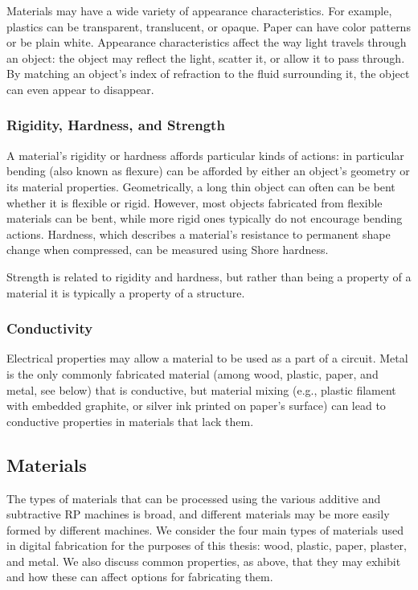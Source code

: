 Materials may have a wide variety of appearance characteristics. For example, plastics can be transparent, translucent, or opaque. Paper can have color patterns or be plain white. Appearance characteristics affect the way light travels through an object: the object may reflect the light, scatter it, or allow it to pass through. By matching an object's index of refraction to the fluid surrounding it, the object can even appear to disappear.

\subsubsection{Rigidity, Hardness, and Strength}

A material's rigidity or hardness affords particular kinds of actions: in particular bending (also known as flexure) can be afforded by either an object's geometry or its material properties. Geometrically, a long thin object can often can be bent whether it is flexible or rigid. However, most objects fabricated from flexible materials can be bent, while more rigid ones typically do not encourage bending actions. Hardness, which describes a material's resistance to permanent shape change when compressed, can be measured using Shore hardness.

Strength is related to rigidity and hardness, but rather than being a property of a material it is typically a property of a structure.

\subsubsection{Conductivity}

Electrical properties may allow a material to be used as a part of a circuit. Metal is the only commonly fabricated material (among wood, plastic, paper, and metal, see below) that is conductive, but material mixing (e.g., plastic filament with embedded graphite, or silver ink printed on paper's surface) can lead to conductive properties in materials that lack them.

\subsection{Materials}

The types of materials that can be processed using the various additive and subtractive RP machines is broad, and different materials may be more easily formed by different machines. We consider the four main types of materials used in digital fabrication for the purposes of this thesis: wood, plastic, paper, plaster, and metal. We also discuss common properties, as above, that they may exhibit and how these can affect options for fabricating them.

